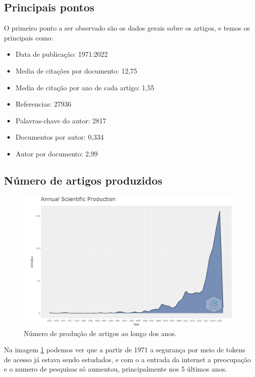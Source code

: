 \subsection{Principais pontos}
O primeiro ponto a ser observado são os dados gerais sobre os artigos, e temos os principais como:
\begin{itemize}
\item Data de publicação: 1971:2022
\item Media de citações por documento: 12,75
\item Media de citação por ano de cada artigo: 1,55
\item Referencias: 27936 
\item Palavras-chave do autor: 2817
\item Documentos por autor: 0,334
\item Autor por documento: 2,99
\end{itemize}

\subsection{Número de artigos produzidos}

\begin{figure}
    \centering
    \includegraphics[width=1\textwidth]{experiments/AllannH/PesquisaBibliometrica/Imagens/TSW-AllannH-numero_producoes.png}
    \caption{Número de produção de artigos ao longo dos anos.}
    \label{fig:AllannH-num_prod}
\end{figure}

Na imagem \ref{fig:AllannH-num_prod} podemos ver que a partir de 1971 a segurança por meio de tokens de acesso já estava sendo estudados, e com o a entrada da internet a preocupação e o numero de pesquisas só aumentou, principalmente nos 5 últimos anos. 

